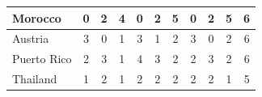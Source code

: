 \documentclass[12pt]{article}  %
\begin{document}
\begin{subappendices}
\begin{longtable}{|l|c|c|c|c|c|c|c|c|c|c|}
	\hline
	Morocco                                                        & 0                                                                      & 2                                                                      & 4                                                                      & 0                                                                      & 2                                                                      & 5                                                                      & 0                         & 2                           & 5                           & 6                           \\ 
	\hline
	Austria                                                        & 3                                                                      & 0                                                                      & 1                                                                      & 3                                                                      & 1                                                                      & 2                                                                      & 3                         & 0                           & 2                           & 6                           \\ 
	\hline
	Puerto Rico                                                    & 2                                                                      & 3                                                                      & 1                                                                      & 4                                                                      & 3                                                                      & 2                                                                      & 2                         & 3                           & 2                           & 6                           \\ 
	\hline
	Thailand                                                       & 1                                                                      & 2                                                                      & 1                                                                      & 2                                                                      & 2                                                                      & 2                                                                      & 2                         & 2                           & 1                           & 5                           \\ 

\end{longtable}
\end{subappendices}
\end{document}
